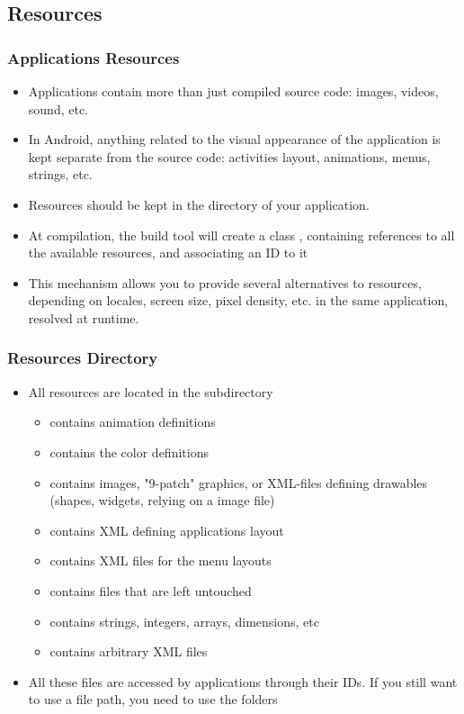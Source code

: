 \subsection{Resources}

\begin{frame}
  \frametitle{Applications Resources}
  \begin{itemize}
  \item Applications contain more than just compiled source code:
    images, videos, sound, etc.
  \item In Android, anything related to the visual appearance of the
    application is kept separate from the source code: activities
    layout, animations, menus, strings, etc.
  \item Resources should be kept in the  directory of your
    application.
  \item At compilation, the build tool will create a class ,
    containing references to all the available resources, and
    associating an ID to it
  \item This mechanism allows you to provide several alternatives to
    resources, depending on locales, screen size, pixel density,
    etc. in the same application, resolved at runtime.
  \end{itemize}
\end{frame}

\begin{frame}
  \frametitle{Resources Directory}
  \begin{itemize}
  \item All resources are located in the  subdirectory
    \begin{itemize}
    \item {} contains animation definitions
    \item {} contains the color definitions
    \item {} contains images, "9-patch" graphics, or XML-files
      defining drawables (shapes, widgets, relying on a image file)
    \item {} contains XML defining applications layout
    \item {} contains XML files for the menu layouts
    \item {} contains files that are left untouched
    \item {} contains strings, integers, arrays,
      dimensions, etc
    \item {} contains arbitrary XML files
    \end{itemize}
  \item All these files are accessed by applications through their
    IDs. If you still want to use a file path, you need to use the
     folders
  \end{itemize}
\end{frame}

